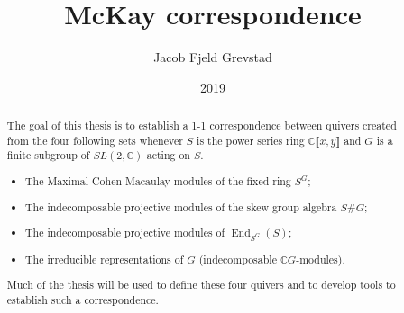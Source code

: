 \documentclass[11pt, a4paper, english]{article}
\theoremstyle{definition}
\newcommand{\C}{\mathbb{C}}
\DeclareMathOperator{\End}{End}
\begin{document}
\title{McKay correspondence}
\author{Jacob Fjeld Grevstad}
\date{2019}
\maketitle
{}

\begin{abstract}
The goal of this thesis is to establish a 1-1 correspondence between quivers created from the four following sets whenever $S$ is the power series ring $\C \llbracket x, y \rrbracket$ and $G$ is a finite subgroup of $SL(2,\C)$ acting on $S$.
\begin{itemize}
\item The Maximal Cohen-Macaulay modules of the fixed ring $S^G$;
\item The indecomposable projective modules of the skew group algebra $S\#G$;
\item The indecomposable projective modules of $\End_{S^G}(S)$;
\item The irreducible representations of $G$ (indecomposable $\C G$-modules).
\end{itemize}
Much of the thesis will be used to define these four quivers and to develop tools to establish such a correspondence. %
\end{abstract}
\clearpage

\tableofcontents
\clearpage

\end{document}
